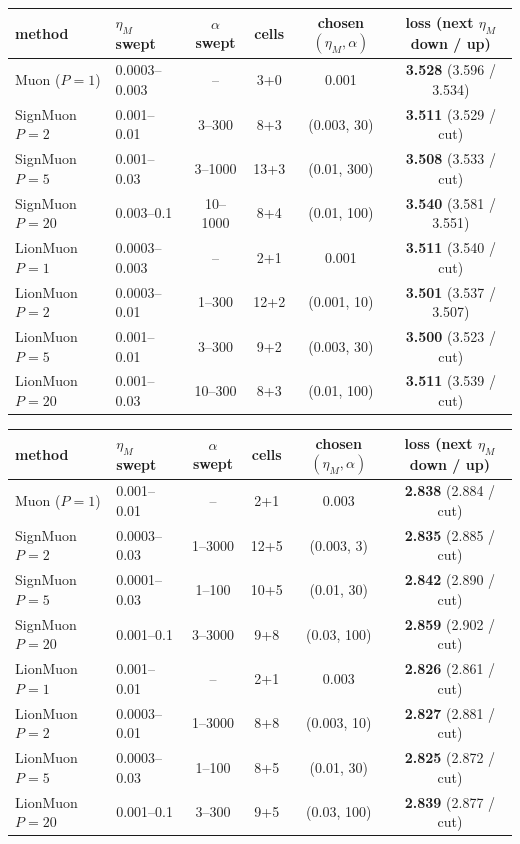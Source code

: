 \begin{tabular}{llcccc}
\toprule
method & $\eta_M$ swept & $\alpha$ swept & cells & chosen $(\eta_M,\alpha)$ & loss (next $\eta_M$ down / up) \\
\midrule
Muon ($P{=}1$) & 0.0003--0.003 & -- & 3+0 & 0.001 & \textbf{3.528} (3.596 / 3.534) \\
SignMuon $P{=}2$ & 0.001--0.01 & 3--300 & 8+3 & (0.003, 30) & \textbf{3.511} (3.529 / cut) \\
SignMuon $P{=}5$ & 0.001--0.03 & 3--1000 & 13+3 & (0.01, 300) & \textbf{3.508} (3.533 / cut) \\
SignMuon $P{=}20$ & 0.003--0.1 & 10--1000 & 8+4 & (0.01, 100) & \textbf{3.540} (3.581 / 3.551) \\
LionMuon $P{=}1$ & 0.0003--0.003 & -- & 2+1 & 0.001 & \textbf{3.511} (3.540 / cut) \\
LionMuon $P{=}2$ & 0.0003--0.01 & 1--300 & 12+2 & (0.001, 10) & \textbf{3.501} (3.537 / 3.507) \\
LionMuon $P{=}5$ & 0.001--0.01 & 3--300 & 9+2 & (0.003, 30) & \textbf{3.500} (3.523 / cut) \\
LionMuon $P{=}20$ & 0.001--0.03 & 10--300 & 8+3 & (0.01, 100) & \textbf{3.511} (3.539 / cut) \\
\bottomrule
\end{tabular}

\begin{tabular}{llcccc}
\toprule
method & $\eta_M$ swept & $\alpha$ swept & cells & chosen $(\eta_M,\alpha)$ & loss (next $\eta_M$ down / up) \\
\midrule
Muon ($P{=}1$) & 0.001--0.01 & -- & 2+1 & 0.003 & \textbf{2.838} (2.884 / cut) \\
SignMuon $P{=}2$ & 0.0003--0.03 & 1--3000 & 12+5 & (0.003, 3) & \textbf{2.835} (2.885 / cut) \\
SignMuon $P{=}5$ & 0.0001--0.03 & 1--100 & 10+5 & (0.01, 30) & \textbf{2.842} (2.890 / cut) \\
SignMuon $P{=}20$ & 0.001--0.1 & 3--3000 & 9+8 & (0.03, 100) & \textbf{2.859} (2.902 / cut) \\
LionMuon $P{=}1$ & 0.001--0.01 & -- & 2+1 & 0.003 & \textbf{2.826} (2.861 / cut) \\
LionMuon $P{=}2$ & 0.0003--0.01 & 1--3000 & 8+8 & (0.003, 10) & \textbf{2.827} (2.881 / cut) \\
LionMuon $P{=}5$ & 0.0003--0.03 & 1--100 & 8+5 & (0.01, 30) & \textbf{2.825} (2.872 / cut) \\
LionMuon $P{=}20$ & 0.001--0.1 & 3--300 & 9+5 & (0.03, 100) & \textbf{2.839} (2.877 / cut) \\
\bottomrule
\end{tabular}
